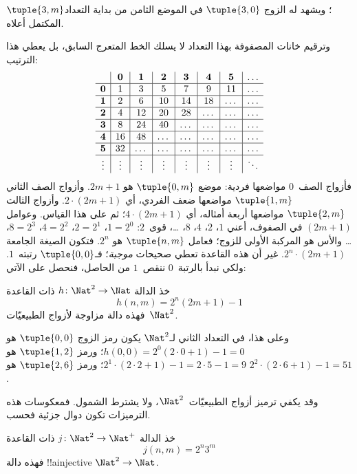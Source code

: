 \documentclass[../../../include/open-logic-section]{subfiles}
\begin{document}
\begin{explain}
\begin{editorial}
$\tuple{3,m}$؛ ويشهد له الزوج $\tuple{3,0}$ في الموضع الثامن
من بداية التعداد المكتمل أعلاه.
\end{editorial}
وترقيم خانات المصفوفة بهذا التعداد لا يسلك الخط المتعرج السابق،
بل يعطي هذا الترتيب:
\[
\begin{array}{ c | c | c | c | c | c | c | c }
& \mathbf 0 & \mathbf 1 & \mathbf 2 & \mathbf 3 & \mathbf 4 & \mathbf 5 & \dots \\
\hline
\mathbf 0 & 1 & 3 & 5 & 7 & 9 & 11 & \dots \\
\hline
\mathbf 1 & 2 & 6 & 10 & 14 & 18 & \dots & \dots \\
\hline
\mathbf 2 & 4 & 12 & 20 & 28 & \dots & \dots & \dots \\
\hline
\mathbf 3 & 8 & 24 & 40 & \dots & \dots & \dots & \dots \\
\hline
\mathbf 4 & 16 & 48 & \dots & \dots & \dots & \dots & \dots \\
\hline
\mathbf 5 & 32 & \dots & \dots & \dots & \dots & \dots & \dots \\
\hline
\vdots & \vdots & \vdots & \vdots & \vdots & \vdots & \vdots & \ddots\\
\end{array}
\]
فأزواج الصف~$0$ مواضعها فردية: موضع $\tuple{0,m}$ هو $2m+1$.
وأزواج الصف الثاني $\tuple{1,m}$ مواضعها ضعف الفردي، أي
$2 \cdot (2m+1)$. وأزواج الثالث $\tuple{2,m}$ مواضعها أربعة
أمثاله، أي $4 \cdot (2m+1)$؛ ثم على هذا القياس. وعوامل
$(2m+1)$ في الصفوف، أعني $1$، $2$، $4$، $8$، \dots، قوى~$2$:
$1= 2^0$، $2 = 2^1$، $4 = 2^2$، $8 = 2^3$، \dots\@
والأس هو المركبة الأولى للزوج؛ فعامل $\tuple{n,m}$ هو $2^n$.
فتكون الصيغة الجامعة $2^n \cdot (2m+1)$. غير أن هذه القاعدة
تعطي صحيحات \emph{موجبة}؛ فـ$\tuple{0,0}$ رتبته~$1$.
ولكي نبدأ بالرتبة~$0$ ننقص~$1$ من الحاصل، فنحصل على الآتي:
\end{explain}

\begin{ex}
خذ الدالة $h\colon \Nat^2 \to \Nat$ ذات القاعدة
\[
h(n,m) = 2^n (2m+1) - 1
\]
فهذه دالة مزاوجة لأزواج الطبيعيّات~$\Nat^2$.
\end{ex}

\begin{explain}
وعلى هذا، في التعداد الثاني لـ$\Nat^2$ يكون رمز الزوج
$\tuple{0,0}$ هو $h(0,0) = 2^0(2\cdot 0+1) - 1 = 0$؛
ورمز $\tuple{1,2}$ هو $2^{1} \cdot (2 \cdot 2 + 1) - 1 = 2
\cdot 5 - 1 = 9$؛ ورمز $\tuple{2,6}$ هو $2^{2} \cdot (2
\cdot 6 + 1) - 1 = 51$.
\end{explain}

وقد يكفي ترميز أزواج الطبيعيّات~$\Nat^2$، ولا يشترط الشمول.
فمعكوسات هذه الترميزات تكون دوال جزئية فحسب.

\begin{ex}
خذ الدالة $j\colon \Nat^2 \to \Nat^+$ ذات القاعدة
\[
j(n,m) = 2^n3^m
\]
فهذه دالة !!a{injective} $\Nat^2 \to \Nat$.
\end{ex}
\end{document}
